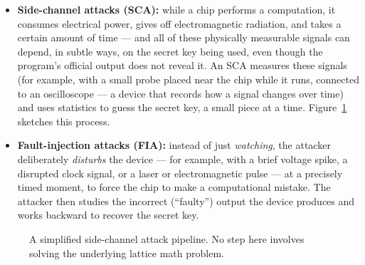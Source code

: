 \documentclass[11pt,a4paper]{article}
\begin{document}
\begin{itemize}[leftmargin=*]
  \item \textbf{Side-channel attacks (SCA):} while a chip performs a computation, it consumes electrical power, gives off electromagnetic radiation, and takes a certain amount of time --- and all of these physically measurable signals can depend, in subtle ways, on the secret key being used, even though the program's official output does not reveal it. An SCA measures these signals (for example, with a small probe placed near the chip while it runs, connected to an oscilloscope --- a device that records how a signal changes over time) and uses statistics to guess the secret key, a small piece at a time. Figure~\ref{fig:scapipeline} sketches this process.
  \item \textbf{Fault-injection attacks (FIA):} instead of just \emph{watching}, the attacker deliberately \emph{disturbs} the device --- for example, with a brief voltage spike, a disrupted clock signal, or a laser or electromagnetic pulse --- at a precisely timed moment, to force the chip to make a computational mistake. The attacker then studies the incorrect (``faulty'') output the device produces and works backward to recover the secret key.
\end{itemize}

\begin{figure}[h]
\centering
{}
\caption{A simplified side-channel attack pipeline. No step here involves solving the underlying lattice math problem.}
\label{fig:scapipeline}
\end{figure}
\end{document}
